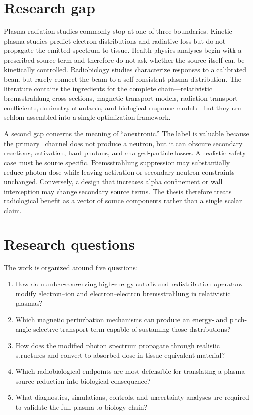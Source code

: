 \section{Research gap}

Plasma-radiation studies commonly stop at one of three boundaries. Kinetic plasma studies predict electron distributions and radiative loss but do not propagate the emitted spectrum to tissue. Health-physics analyses begin with a prescribed source term and therefore do not ask whether the source itself can be kinetically controlled. Radiobiology studies characterize responses to a calibrated beam but rarely connect the beam to a self-consistent plasma distribution. The literature contains the ingredients for the complete chain---relativistic bremsstrahlung cross sections, magnetic transport models, radiation-transport coefficients, dosimetry standards, and biological response models---but they are seldom assembled into a single optimization framework.

A second gap concerns the meaning of ``aneutronic.'' The label is valuable because the primary \pB \ channel does not produce a neutron, but it can obscure secondary reactions, activation, hard photons, and charged-particle losses. A realistic safety case must be source specific. Bremsstrahlung suppression may substantially reduce photon dose while leaving activation or secondary-neutron constraints unchanged. Conversely, a design that increases alpha confinement or wall interception may change secondary source terms. The thesis therefore treats radiological benefit as a vector of source components rather than a single scalar claim.

\section{Research questions}

The work is organized around five questions:
\begin{enumerate}[label=\textbf{RQ\arabic*:},leftmargin=2.2cm]
\item How do number-conserving high-energy cutoffs and redistribution operators modify electron--ion and electron--electron bremsstrahlung in relativistic plasmas?
\item Which magnetic perturbation mechanisms can produce an energy- and pitch-angle-selective transport term capable of sustaining those distributions?
\item How does the modified photon spectrum propagate through realistic structures and convert to absorbed dose in tissue-equivalent material?
\item Which radiobiological endpoints are most defensible for translating a plasma source reduction into biological consequence?
\item What diagnostics, simulations, controls, and uncertainty analyses are required to validate the full plasma-to-biology chain?
\end{enumerate}

